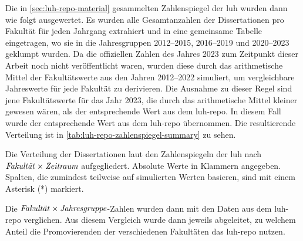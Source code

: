 Die in \cref{sec:luh-repo-material} gesammelten Zahlenspiegel der \gls{luh} wurden dann wie folgt ausgewertet.
Es wurden alle Gesamtanzahlen der Dissertationen pro Fakultät für jeden Jahrgang extrahiert und in eine gemeinsame Tabelle eingetragen, wo sie in die Jahresgruppen 2012--2015, 2016--2019 und 2020--2023 geklumpt wurden.
Da die offiziellen Zahlen des Jahres 2023 zum Zeitpunkt dieser Arbeit noch nicht veröffentlicht waren, wurden diese durch das arithmetische Mittel der Fakultätswerte aus den Jahren 2012--2022 simuliert, um vergleichbare Jahreswerte für jede Fakultät zu derivieren.
Die Ausnahme zu dieser Regel sind jene Fakultätswerte für das Jahr 2023, die durch das arithmetische Mittel kleiner gewesen wären, als der entsprechende Wert aus dem \gls{luh-repo}.
In diesem Fall wurde der entsprechende Wert aus dem \gls{luh-repo} übernommen.
Die resultierende Verteilung ist in \cref{tab:luh-repo-zahlenspiegel-summary} zu sehen.
\begin{table}[!htbp]
	\caption{Die Verteilung der Dissertationen laut den Zahlenspiegeln der \gls{luh} nach $\text{\textit{Fakultät}}\times\text{\textit{Zeitraum}}$ aufgegliedert.
    Absolute Werte in Klammern angegeben.
    Spalten, die zumindest teilweise auf simulierten Werten basieren, sind mit einem Asterisk (*) markiert.}
    
	\label{tab:luh-repo-zahlenspiegel-summary}
\end{table}
Die $\text{\textit{Fakultät}}\times\text{\textit{Jahresgruppe}}$-Zahlen wurden dann mit den Daten aus dem \gls{luh-repo} verglichen.
Aus diesem Vergleich wurde dann jeweils abgeleitet, zu welchem Anteil die Promovierenden der verschiedenen Fakultäten das \gls{luh-repo} nutzen.

